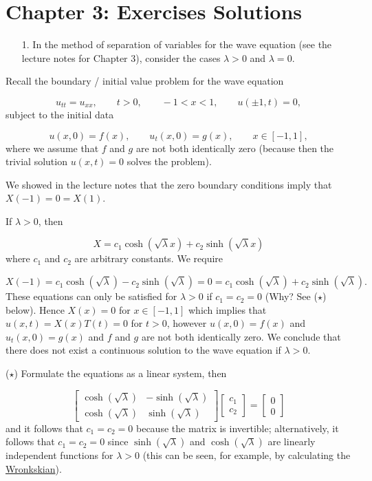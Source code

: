 \documentclass[12pt,a4paper]{article}
\begin{document}
\section{Chapter 3: Exercises Solutions}
\begin{itemize}
\item[1. ] In the method of separation of variables for the wave equation (see the lecture notes for Chapter 3), consider the cases $\lambda > 0$ and $\lambda = 0$.

\end{itemize}
Recall the boundary / initial value problem for the wave equation

\[
u_{tt} = u_{xx}, \qquad t > 0, \qquad -1 < x < 1, \qquad u(\pm 1, t) = 0,
\]
subject to the initial data

\[
u(x,0) = f(x), \qquad u_t(x,0) = g(x), \qquad x \in [-1, 1],
\]
where we assume that $f$ and $g$ are not both identically zero (because then the trivial solution $u(x,t) = 0$ solves the problem).

We showed in the lecture notes that the zero boundary conditions imply that $X(-1) = 0 = X(1)$.

If $\lambda > 0$, then

\[
X = c_1\cosh(\sqrt{\lambda}x) + c_2\sinh(\sqrt{\lambda}x)
\]
where $c_1$ and $c_2$ are arbitrary constants.  We require

\[
X(-1) = c_1\cosh(\sqrt{\lambda}) - c_2\sinh(\sqrt{\lambda}) = 0 =  c_1\cosh(\sqrt{\lambda}) + c_2\sinh(\sqrt{\lambda}).
\]
These equations can only be satisfied for $\lambda > 0$ if $c_1 = c_2 = 0$ (Why? See ($\star$) below).  Hence $X(x) = 0$ for $x \in [-1, 1]$ which implies that $u(x,t) = X(x)T(t) = 0$ for $t > 0$, however $u(x,0) = f(x)$ and $u_t(x,0) = g(x)$ and $f$ and $g$ are not both identically zero.   We conclude that there does not exist a continuous solution to the wave equation if $\lambda > 0$.

($\star$) Formulate the equations as a linear system, then 

\[
\begin{bmatrix}
\cosh(\sqrt{\lambda}) & -\sinh(\sqrt{\lambda}) \\
\cosh(\sqrt{\lambda}) & \sinh(\sqrt{\lambda})
\end{bmatrix}
\begin{bmatrix}
c_1 \\
c_2
\end{bmatrix} = 
\begin{bmatrix}
0 \\
0
\end{bmatrix}
\]
and it follows that $c_1 = c_2 = 0$ because the matrix is invertible; alternatively, it follows  that $c_1 = c_2 = 0$  since  $\sinh (\sqrt{\lambda})$ and $\cosh(\sqrt{\lambda})$ are linearly independent functions for $\lambda > 0$ (this can be seen, for example, by calculating the \href{https://en.wikipedia.org/wiki/Wronskian}{Wronkskian}).
\end{document}
